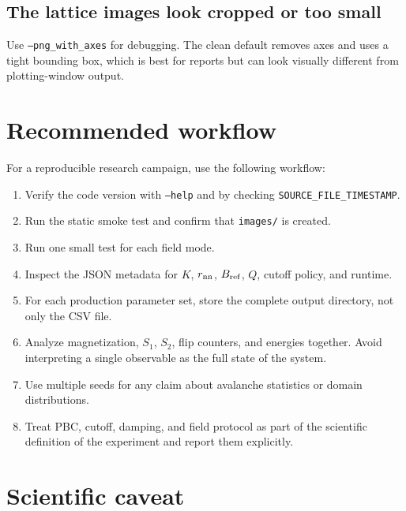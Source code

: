 \documentclass[11pt,a4paper]{article}
\newcommand{\code}[1]{\texttt{#1}}
\begin{document}
\subsection{The lattice images look cropped or too small}

Use \code{--png\_with\_axes} for debugging. The clean default removes axes and uses a tight bounding box, which is best for reports but can look visually different from plotting-window output.

\section{Recommended workflow}
\label{sec:workflow}

For a reproducible research campaign, use the following workflow:

\begin{enumerate}[leftmargin=*]
    \item Verify the code version with \code{--help} and by checking \code{SOURCE\_FILE\_TIMESTAMP}.
    \item Run the static smoke test and confirm that \code{images/} is created.
    \item Run one small test for each field mode.
    \item Inspect the JSON metadata for $K$, $r_{\rm nn}$, $B_{\rm ref}$, $Q$, cutoff policy, and runtime.
    \item For each production parameter set, store the complete output directory, not only the CSV file.
    \item Analyze magnetization, $S_1$, $S_2$, flip counters, and energies together. Avoid interpreting a single observable as the full state of the system.
    \item Use multiple seeds for any claim about avalanche statistics or domain distributions.
    \item Treat PBC, cutoff, damping, and field protocol as part of the scientific definition of the experiment and report them explicitly.
\end{enumerate}

\section{Scientific caveat}
\label{sec:caveat}
\end{document}
